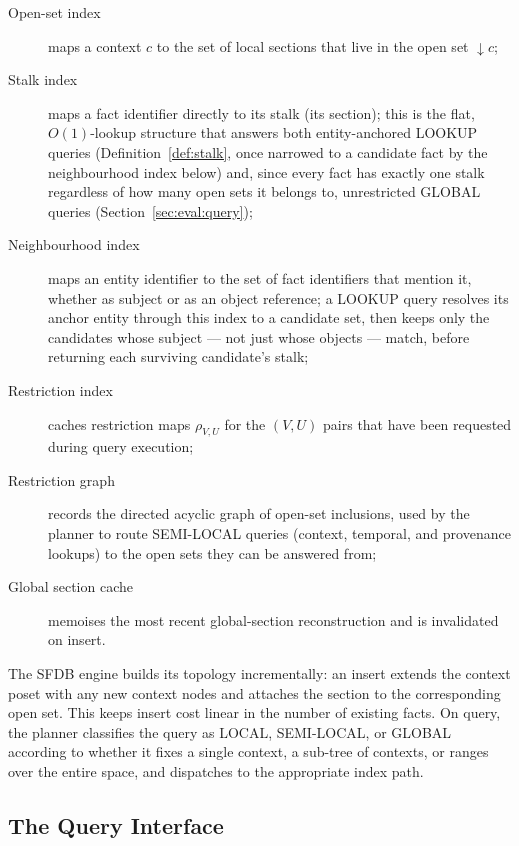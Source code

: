 \begin{description}
    \item[Open-set index] maps a context $c$ to the set of local sections
          that live in the open set $\downarrow c$;
    \item[Stalk index] maps a fact identifier directly to its stalk (its
          section); this is the flat, $O(1)$-lookup structure that answers
          both entity-anchored LOOKUP queries (Definition~\ref{def:stalk},
          once narrowed to a candidate fact by the neighbourhood index
          below) and, since every fact has exactly one stalk regardless of
          how many open sets it belongs to, unrestricted GLOBAL queries
          (Section~\ref{sec:eval:query});
    \item[Neighbourhood index] maps an entity identifier to the set of
          fact identifiers that mention it, whether as subject or as an
          object reference; a LOOKUP query resolves its anchor entity
          through this index to a candidate set, then keeps only the
          candidates whose subject --- not just whose objects --- match,
          before returning each surviving candidate's stalk;
    \item[Restriction index] caches restriction maps $\rho_{V, U}$ for the
          $(V, U)$ pairs that have been requested during query execution;
    \item[Restriction graph] records the directed acyclic graph of open-set
          inclusions, used by the planner to route SEMI-LOCAL queries
          (context, temporal, and provenance lookups) to the open sets
          they can be answered from;
    \item[Global section cache] memoises the most recent global-section
          reconstruction and is invalidated on insert.
\end{description}

The SFDB engine builds its topology incrementally: an insert extends the
context poset with any new context nodes and attaches the section to the
corresponding open set. This keeps insert cost linear in the number of
existing facts. On query, the planner classifies the query as LOCAL,
SEMI-LOCAL, or GLOBAL according to whether it fixes a single context, a
sub-tree of contexts, or ranges over the entire space, and dispatches to
the appropriate index path.

\subsection{The Query Interface}
\label{sec:arch:query}

